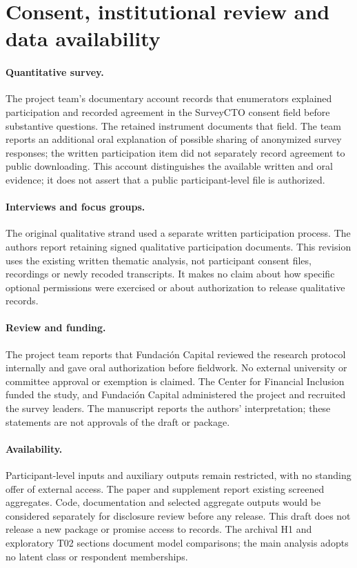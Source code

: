 \section{Consent, institutional review and data availability}
\paragraph{Quantitative survey.} The project team's documentary account records that enumerators explained participation and recorded agreement in the SurveyCTO consent field before substantive questions. The retained instrument documents that field. The team reports an additional oral explanation of possible sharing of anonymized survey responses; the written participation item did not separately record agreement to public downloading. This account distinguishes the available written and oral evidence; it does not assert that a public participant-level file is authorized.

\paragraph{Interviews and focus groups.} The original qualitative strand used a separate written participation process. The authors report retaining signed qualitative participation documents. This revision uses the existing written thematic analysis, not participant consent files, recordings or newly recoded transcripts. It makes no claim about how specific optional permissions were exercised or about authorization to release qualitative records.

\paragraph{Review and funding.} The project team reports that Fundación Capital reviewed the research protocol internally and gave oral authorization before fieldwork. No external university or committee approval or exemption is claimed. The Center for Financial Inclusion funded the study, and Fundación Capital administered the project and recruited the survey leaders. The manuscript reports the authors' interpretation; these statements are not approvals of the draft or package.

\paragraph{Availability.} Participant-level inputs and auxiliary outputs remain restricted, with no standing offer of external access. The paper and supplement report existing screened aggregates. Code, documentation and selected aggregate outputs would be considered separately for disclosure review before any release. This draft does not release a new package or promise access to records. The archival H1 and exploratory T02 sections document model comparisons; the main analysis adopts no latent class or respondent memberships.
